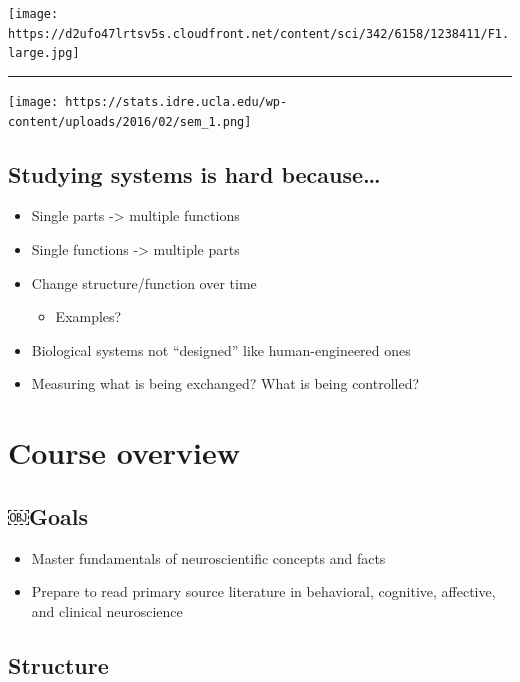 \documentclass[]{article}
\providecommand{\tightlist}{%
  \setlength{\itemsep}{0pt}\setlength{\parskip}{0pt}}
\begin{document}
\texttt{[image: https://d2ufo47lrtsv5s.cloudfront.net/content/sci/342/6158/1238411/F1.large.jpg]}

\begin{center}\rule{0.5\linewidth}{\linethickness}\end{center}


\texttt{[image: https://stats.idre.ucla.edu/wp-content/uploads/2016/02/sem\_1.png]}

\subsection{Studying systems is hard
because\ldots{}}\label{studying-systems-is-hard-because}

\begin{itemize}
\tightlist
\item
  Single parts -\textgreater{} multiple functions
\item
  Single functions -\textgreater{} multiple parts
\item
  Change structure/function over time

  \begin{itemize}
  \tightlist
  \item
    Examples?
  \end{itemize}
\item
  Biological systems not ``designed'' like human-engineered ones
\item
  Measuring what is being exchanged? What is being controlled?
\end{itemize}

\section{Course overview}\label{course-overview}

\subsection{￼Goals}\label{goals}

\begin{itemize}
\tightlist
\item
  Master fundamentals of neuroscientific concepts and facts
\item
  Prepare to read primary source literature in behavioral, cognitive,
  affective, and clinical neuroscience
\end{itemize}

\subsection{Structure}\label{structure}
\end{document}
